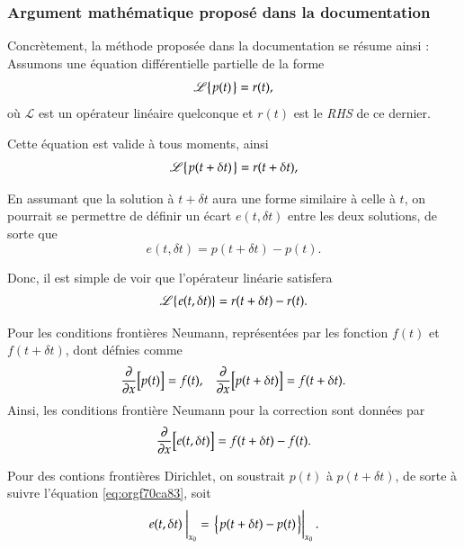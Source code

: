 \documentclass[10pt]{article}
\numberwithin{equation}{section}
\newcommand{\tall}{\vphantom{A^{x^x}_p}}
\newcommand{\pt}{\hspace{1pt}} %
\begin{document}
\subsubsection{Argument mathématique proposé dans la documentation}
\label{sec:orgd61683b}
Concrètement, la méthode proposée dans la documentation se résume ainsi :
Assumons une équation différentielle partielle de la forme
\begin{equation}
   \mathscr{L}\qty{\pt p(t)\pt} = r(t),
\end{equation}
où \(\mathscr{L}\) est un opérateur linéaire quelconque et \(r(t)\) est le \emph{RHS} de ce dernier.\bigskip

Cette équation est valide à tous moments, ainsi
\begin{equation}
   \mathscr{L}\qty{\pt p(t+\delta t)\pt} = r(t+\delta t),
\end{equation}

En assumant que la solution à \(t+\delta t\) aura une forme similaire à celle à \(t\), on pourrait se permettre de définir un écart \(e(t,\delta t)\) entre les deux solutions, de sorte que
\begin{equation}
\label{eq:orgf70ca83}
   e(t,\delta t) = p(t+\delta t) - p(t).
\end{equation}

Donc, il est simple de voir que l'opérateur linéarie satisfera
\begin{equation}
   \mathscr{L}\qty{\pt e(t,\delta t)} = r(t+\delta t) - r(t).
\end{equation}

Pour les conditions frontières Neumann, représentées par les fonction \(f(t)\) et \(f(t+\delta t)\), dont défnies comme
\begin{align}
   && \pdv{}{x} \qty[ \tall p(t) ] = f(t), && \pdv{}{x} \qty[\tall p(t+\delta t)] = f(t+\delta t). &&
\end{align}
Ainsi, les conditions frontière Neumann pour la correction sont données par
\begin{equation}
   \pdv{}{x} \qty[ \tall e(t,\delta t) ]  = f(t+\delta t) - f(t).
\end{equation}

Pour des contions frontières Dirichlet, on soustrait \(p(t)\) à \(p(t+\delta t)\), de sorte à suivre l'équation \ref{eq:orgf70ca83}, soit
\begin{equation}
   \eval{e(t,\delta t)\ }_{x_0} = \eval{ \qty{ \pt p(t+\delta t) - p(t)\pt \tall } }_{x_0}.
\end{equation}
\end{document}

